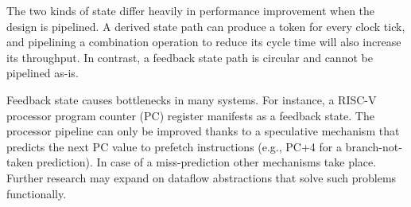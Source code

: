 The two kinds of state differ heavily in performance improvement when the design is pipelined. A derived state path can produce a token for every clock tick, and pipelining a combination operation to reduce its cycle time will also increase its throughput. In contrast, a feedback state path is circular and cannot be pipelined as-is. 

Feedback state causes bottlenecks in many systems. For instance, a RISC-V processor program counter (PC) register manifests as a feedback state. The processor pipeline can only be improved thanks to a speculative mechanism that predicts the next PC value to prefetch instructions (e.g., PC+4 for a branch-not-taken prediction). In case of a miss-prediction other mechanisms take place. Further research may expand on dataflow abstractions that solve such problems functionally.



